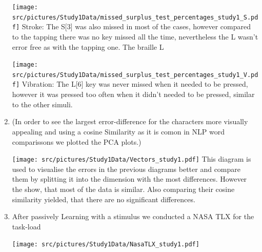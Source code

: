 \begin{enumerate}
        
        \centering
        \texttt{[image: src/pictures/Study1Data/missed\_surplus\_test\_percentages\_study1\_S.pdf]}
Stroke:
The S[3] was also missed in most of the cases, however compared to the tapping there was no key missed all the time, nevertheless the L wasn't error free as with the tapping one.
The braille L 



        \centering
        \texttt{[image: src/pictures/Study1Data/missed\_surplus\_test\_percentages\_study1\_V.pdf]}
Vibration:
The L[6] key was never missed when it needed to be pressed, however it was pressed too often when it didn't needed to be pressed, similar to the other simuli.

    \item (In order to see the largest error-difference for the characters more visually appealing and using a cosine Similarity as it is comon in NLP word comparissons we plotted the PCA plots.)
    
    \centering
    \texttt{[image: src/pictures/Study1Data/Vectors\_study1.pdf]}
This diagram is used to visualise the errors in the previous diagrams better and compare them by splitting it into the dimension with the most differences.
However the show, that most of the data is similar.
Also comparing their cosine similarity yielded, that there are no significant differences.

    \item After passively Learning with a stimulus we conducted a NASA TLX for the task-load
    
        \centering
        \texttt{[image: src/pictures/Study1Data/NasaTLX\_study1.pdf]}


\begin{table}[ht]
\caption{Results of the Kruskal-Wallis significance tests for the different NasaTLX dimensions with a $\eta^2$ Effect Size.}
\label{table:nasaTLX_significance_firstStudy_nonParam}
\end{table}


\end{enumerate}
